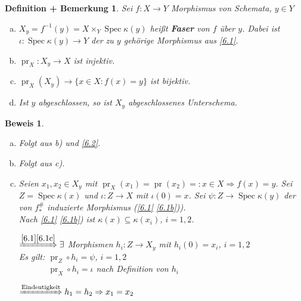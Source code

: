 \documentclass[paper = A4, fontsize=12pt, numbers=noendperiod, chapterprefix=true]{scrbook}
\theoremstyle{break}
\newtheorem{DefBem}[Def]{Definition + Bemerkung}
\theoremstyle{nonumberbreak}
\newtheorem{bew}{Beweis}
\theoremstyle{nonumberplain}
\newcommand{\emp}[1]{\textbf{\emph{#1}}}
\newcommand{\defterm}[1]{{\index{#1}}\emp{#1}}
\DeclareMathOperator{\Spec}{Spec}
\DeclareMathOperator{\pr}{pr}
\newcommand{\X}{\times}
\begin{document}

\begin{DefBem}
Sei $f:X \to Y$ Morphismus von Schemata, $y \in Y$\begin{enumerate}[a)]
\item
	$X_y = f^{-1}(y) = X \X_Y \Spec \kappa(y)$ hei\ss t \defterm{Faser} von $f$ \"uber $y$. Dabei ist $\iota: \Spec \kappa(y) \to Y$ der zu $y$ geh\"orige Morphismus aus \ref{6.1}.
\item
	$\pr_X: X_y \to X$ ist injektiv.
\item
	$\pr_X(X_y) \to \{ x\in X: f(x) = y \}$ ist bijektiv.
\item
	Ist $y$ abgeschlossen, so ist $X_y$ abgeschlossenes Unterschema.
\end{enumerate}\end{DefBem}

\begin{bew}\begin{enumerate}[a)]
\item[c)]
	Folgt aus b) und \ref{6.2}.
\item[d)]
	Folgt aus c).
\item[b)]
	Seien $x_1, x_2 \in X_y$ mit $\pr_X(x_1) = \pr(x_2) =: x \in X \Rightarrow f(x) = y$. Sei $Z = \Spec \kappa(x)$ und $\iota: Z \to X$ mit $\iota(0) = x$. Sei $\psi: Z \to \Spec \kappa(y)$ der von $f_*^\#$ induzierte Morphismus (\ref{6.1} \ref{6.1b})).\\
	Nach \ref{6.1} \ref{6.1b}) ist $\kappa(x) \subseteq \kappa(x_i)$, $i=1,2$.
	\begin{center}\end{center}
	$\xRightarrow{\ref{6.1} \ref{6.1c}} \exists$ Morphismen $h_i: Z \to X_y$ mit $h_i(0) = x_i$, $i = 1,2$\\
	Es gilt: $\pr_Z \circ h_i = \psi$, $i = 1,2$\\
	\textcolor{white}{Es gilt:} $\pr_X \circ h_i = \iota$ nach Definition von $h_i$
	
	$\xRightarrow{\text{Eindeutigkeit}} h_1 = h_2 \Rightarrow x_1 = x_2$
\end{enumerate}\end{bew}
\end{document}
